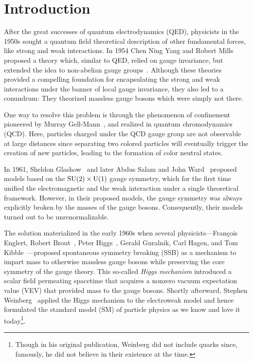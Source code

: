 
\chapter{Introduction}\label{chap:one}

After the great successes of quantum electrodynamics (\acs{QED}), physicists in the 1950s sought a quantum field theoretical description of other fundamental forces, like strong and weak interactions. In 1954 Chen Ning Yang and Robert Mills proposed a theory which, similar to \acs{QED}, relied on gauge invariance, but extended the idea to non-abelian gauge groups~\cite{Yang:1954ek}. Although these theories provided a compelling foundation for encapsulating the strong and weak interactions under the banner of local gauge invariance, they also led to a conundrum: They theorized massless gauge bosons which were simply not there.

One way to resolve this problem is through the phenomenon of confinement pioneered by Murray Gell-Mann~\cite{Gell-Mann:1961omu}, and realized in quantum chromodynamics (\acs{QCD}). Here, particles charged under the \acs{QCD} gauge group are not observable at large distances since separating two colored particles will eventually trigger the creation of new particles, leading to the formation of color neutral states.

In 1961, Sheldon Glashow~\cite{Glashow:1961tr} and later Abdus Salam and John Ward~\cite{Salam:1964ry} proposed models based on the $\mathrm{SU}(2)\times \mathrm{U}(1)$ gauge symmetry, which for the first time unified the electromagnetic and the weak interaction under a single theoretical framework. However, in their proposed models, the gauge symmetry was always explicitly broken by the masses of the gauge bosons. Consequently, their models turned out to be unrenormalizable.

The solution materialized in the early 1960s when several physicists---François Englert, Robert Brout~\cite{Englert:1964et}, Peter Higgs~\cite{Higgs:1966ev}, Gerald Guralnik, Carl Hagen, and Tom Kibble~\cite{Guralnik:1964eu}---proposed spontaneous symmetry breaking (\acs{SSB}) as a mechanism to impart mass to otherwise massless gauge bosons while preserving the core symmetry of the gauge theory. This so-called \textit{Higgs mechanism} introduced a scalar field permeating spacetime that acquires a nonzero vacuum expectation value (\acs{VEV}) that provided mass to the gauge bosons. Shortly afterward, Stephen Weinberg~\cite{Weinberg:1967tq} applied the Higgs mechanism to the electroweak model and hence formulated the standard model (\acs{SM}) of particle physics as we know and love it today\footnote{Though in his original publication, Weinberg did not include quarks since, famously, he did not believe in their existence at the time.}.

